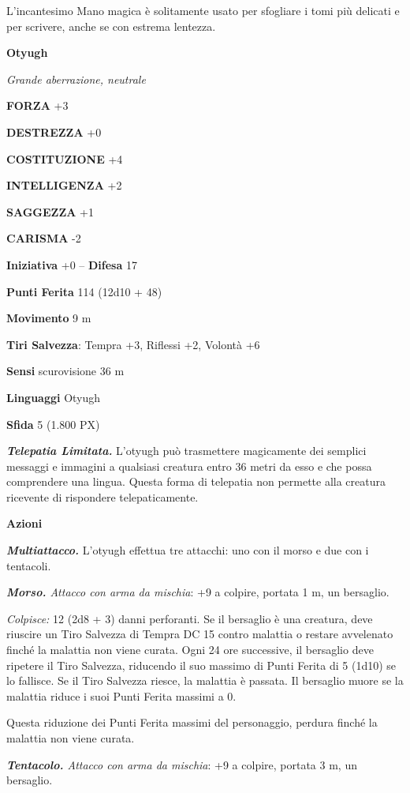 \begin{multicols}{2}
	L'incantesimo Mano magica è solitamente usato per sfogliare i tomi più delicati e per scrivere, anche se con estrema lentezza.

	\medskip{}\textbf{Otyugh}

	\textit{Grande aberrazione, neutrale}

	\textbf{FORZA} +3

	\textbf{DESTREZZA} +0

	\textbf{COSTITUZIONE} +4

	\textbf{INTELLIGENZA} +2

	\textbf{SAGGEZZA} +1

	\textbf{CARISMA} -2

	\textbf{Iniziativa} +0 -- \textbf{Difesa} 17

	\textbf{Punti Ferita} 114 (12d10 + 48)

	\textbf{Movimento} 9 m

	\textbf{Tiri Salvezza}: Tempra +3, Riflessi +2, Volontà +6

	\textbf{Sensi} scurovisione 36 m

	\textbf{Linguaggi} Otyugh

	\textbf{Sfida} 5 (1.800 PX)

	\textit{\textbf{Telepatia Limitata.}} L'otyugh può trasmettere magicamente dei semplici messaggi e immagini a qualsiasi creatura entro 36 metri da esso e che possa comprendere una lingua. Questa forma di telepatia non permette alla creatura ricevente di rispondere telepaticamente.

	\textbf{Azioni}

	\textit{\textbf{Multiattacco.}} L'otyugh effettua tre attacchi: uno con il morso e due con i tentacoli.

	\textit{\textbf{Morso.} Attacco con arma da mischia}: +9 a colpire, portata 1 m, un bersaglio.

	\textit{Colpisce:} 12 (2d8 + 3) danni perforanti. Se il bersaglio è una creatura, deve riuscire un Tiro Salvezza di Tempra DC 15 contro malattia o restare avvelenato finché la malattia non viene curata. Ogni 24 ore successive, il bersaglio deve ripetere il Tiro Salvezza, riducendo il suo massimo di Punti Ferita di 5 (1d10) se lo fallisce. Se il Tiro Salvezza riesce, la malattia è passata. Il bersaglio muore se la malattia riduce i suoi Punti Ferita massimi a 0.

	Questa riduzione dei Punti Ferita massimi del personaggio, perdura finché la malattia non viene curata.

	\textit{\textbf{Tentacolo.} Attacco con arma da mischia}: +9 a colpire, portata 3 m, un bersaglio.


\end{multicols}
